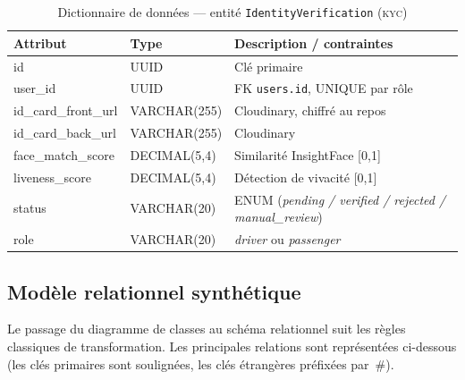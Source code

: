\documentclass[12pt, a4paper, oneside]{report}
\begin{document}
\begin{table}[H]
\centering
\footnotesize
\begin{tabularx}{\textwidth}{|l|l|X|}
\hline
\rowcolor{rohlight}
\textbf{Attribut} & \textbf{Type} & \textbf{Description / contraintes} \\
\hline
id & UUID & Clé primaire \\
\hline
user\_id & UUID & FK \texttt{users.id}, UNIQUE par rôle \\
\hline
id\_card\_front\_url & VARCHAR(255) & Cloudinary, chiffré au repos \\
\hline
id\_card\_back\_url & VARCHAR(255) & Cloudinary \\
\hline
face\_match\_score & DECIMAL(5,4) & Similarité InsightFace [0,1] \\
\hline
liveness\_score & DECIMAL(5,4) & Détection de vivacité [0,1] \\
\hline
status & VARCHAR(20) & ENUM (\textit{pending / verified / rejected / manual\_review}) \\
\hline
role & VARCHAR(20) & \textit{driver} ou \textit{passenger} \\
\hline
\end{tabularx}
  \caption{Dictionnaire de données --- entité \texttt{IdentityVerification} (\textsc{kyc})}
  \label{tab:dict-kyc}
\end{table}

\subsection{Modèle relationnel synthétique}

Le passage du diagramme de classes au schéma relationnel suit les règles classiques de transformation. Les principales relations sont représentées ci-dessous (les clés primaires sont soulignées, les clés étrangères préfixées par~\#).
\end{document}
